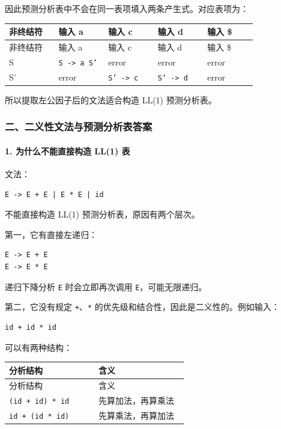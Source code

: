 \documentclass[UTF8]{ctexart}
\begin{document}
因此预测分析表中不会在同一表项填入两条产生式。对应表项为：

\begin{longtable}{|p{0.19\linewidth}|p{0.19\linewidth}|p{0.19\linewidth}|p{0.19\linewidth}|p{0.19\linewidth}|}
\hline
非终结符 & 输入 a & 输入 c & 输入 d & 输入 \$ \\
\hline
\endfirsthead
非终结符 & 输入 a & 输入 c & 输入 d & 输入 \$ \\
\hline
\endhead
S & \texttt{S -> a S'} & error & error & error \\
\hline
S' & error & \texttt{S' -> c} & \texttt{S' -> d} & error \\
\hline
\end{longtable}

所以提取左公因子后的文法适合构造 LL(1) 预测分析表。

\subsubsection*{二、二义性文法与预测分析表答案}

\paragraph*{1. 为什么不能直接构造 LL(1) 表}

文法：

\begin{Verbatim}[fontsize=\small,breaklines=true]
E -> E + E | E * E | id
\end{Verbatim}

不能直接构造 LL(1) 预测分析表，原因有两个层次。

第一，它有直接左递归：

\begin{Verbatim}[fontsize=\small,breaklines=true]
E -> E + E
E -> E * E
\end{Verbatim}

递归下降分析 \texttt{E} 时会立即再次调用 \texttt{E}，可能无限递归。

第二，它没有规定 \texttt{+}、\texttt{*} 的优先级和结合性，因此是二义性的。例如输入：

\begin{Verbatim}[fontsize=\small,breaklines=true]
id + id * id
\end{Verbatim}

可以有两种结构：

\begin{longtable}{|p{0.47\linewidth}|p{0.47\linewidth}|}
\hline
分析结构 & 含义 \\
\hline
\endfirsthead
分析结构 & 含义 \\
\hline
\endhead
\texttt{(id + id) * id} & 先算加法，再算乘法 \\
\hline
\texttt{id + (id * id)} & 先算乘法，再算加法 \\
\hline
\end{longtable}
\end{document}
